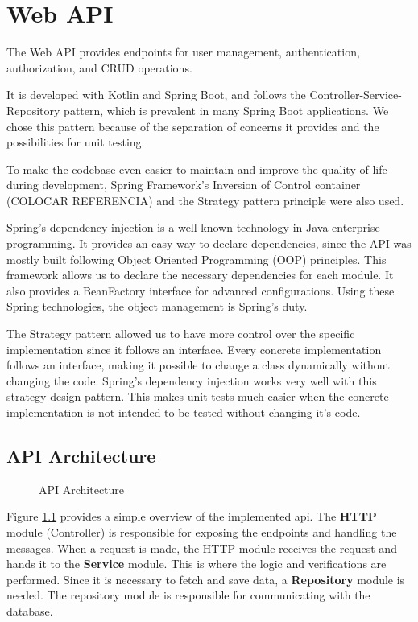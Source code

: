 \chapter{Web API} \label{cap:web_api}
The Web API provides endpoints for user management, authentication, authorization, and CRUD operations. 

It is developed with Kotlin and Spring Boot, and follows the Controller-Service-Repository pattern, which is prevalent in many Spring Boot applications. We chose this pattern because of the separation of concerns it provides and the possibilities for unit testing.

To make the codebase even easier to maintain and improve the quality of life during development, Spring Framework's Inversion of Control container (COLOCAR REFERENCIA) and the Strategy pattern principle were also used. 

Spring's dependency injection is a well-known technology in Java enterprise programming. It provides an easy way to declare dependencies, since the API was mostly built following Object Oriented Programming (OOP) principles. This framework allows us to declare the necessary dependencies for each module. It also provides a BeanFactory interface for advanced configurations. Using these Spring technologies, the object management is Spring's duty.

The Strategy pattern allowed us to have more control over the specific implementation since it follows an interface. Every concrete implementation follows an interface, making it possible to change a class dynamically without changing the code. Spring's dependency injection works very well with this strategy design pattern. This makes unit tests much easier when the concrete implementation is not intended to be tested without changing it's code.

\section{API Architecture}

\begin{figure}[H]
    \centering
    
    \caption{API Architecture}
    \label{fig:api_architecture}
\end{figure}

Figure \ref{fig:api_architecture} provides a simple overview of the implemented \acs{api}. The \textbf{HTTP} module (Controller) is responsible for exposing the endpoints and handling the messages. When a request is made, the HTTP module receives the request and hands it to the \textbf{Service} module. This is where the logic and verifications are performed. Since it is necessary to fetch and save data, a \textbf{Repository} module is needed. The repository module is responsible for communicating with the database.

